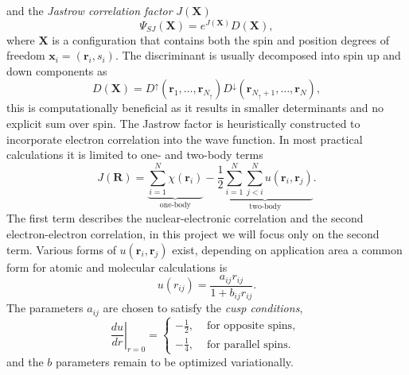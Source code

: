 \documentclass[final,3p,times,twocolumn]{elsarticle}
\begin{document}
	and the \emph{Jastrow correlation factor} $J(\mathbf{X})$
	\begin{equation}
		\Psi_{SJ}(\mathbf{X})=e^{J(\mathbf{X})} D(\mathbf{X}),
	\end{equation}
	where $\mathbf{X}$ is a configuration that contains both the spin and position degrees of freedom $\mathbf{x}_i = (\mathbf{r}_i, s_i)$. The discriminant is usually decomposed into spin up and down components as
	\begin{equation}
		D(\mathbf{X}) = D^{\uparrow}\left(\mathbf{r}_{1}, \ldots, \mathbf{r}_{N_{\uparrow}}\right) D^{\downarrow}\left(\mathbf{r}_{N_{\uparrow}+1}, \ldots, \mathbf{r}_{N}\right),
	\end{equation}
	this is computationally beneficial as it results in smaller determinants and no explicit sum over spin.
	The Jastrow factor is heuristically constructed to incorporate electron correlation into the wave function. In most practical calculations it is limited to one- and two-body terms~\cite{foulkes2001quantum}
	\begin{equation}
		J(\mathbf{R})=
		\underbrace{\sum_{i=1}^{N} \chi\left(\mathbf{r}_{i}\right)}_{\text{one-body}}
		-
		\underbrace{\frac{1}{2} \sum_{i=1}^{N} \sum_{j<i}^{N} u\left(\mathbf{r}_{i}, \mathbf{r}_{j}\right)}_{\text{two-body}}.
	\end{equation}
	The first term describes the nuclear-electronic correlation and the second electron-electron correlation, in this project we will focus only on the second term. 
	Various forms of $u(\mathbf{r}_{i}, \mathbf{r}_{j})$ exist, depending on application area a common form for atomic and molecular calculations is
	\begin{equation}
		u(r_{ij})=\frac{a_{ij} r_{ij}}{1+b_{ij} r_{ij}}.
	\end{equation}
	The parameters $a_{ij}$ are chosen to satisfy the \emph{cusp conditions},  
	\begin{equation}
		\left.\frac{d u}{d r}\right|_{r=0}=\left\{\begin{array}{cl}-\frac{1}{2}, & \text { for opposite spins, } \\ -\frac{1}{4}, & \text { for parallel spins. }\end{array}\right.
	\end{equation}
	and the $b$ parameters remain to be optimized variationally. 
	
\end{document}
